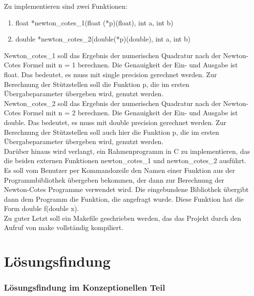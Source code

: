 \documentclass[course=erap]{aspdoc}
\begin{document}
Zu implementieren sind zwei Funktionen:
\begin{enumerate}
\item float *newton\_cotes\_1(float (*p)(float), int a, int b)
\item double *newton\_cotes\_2(double(*p)(double), int a, int b)
\end{enumerate}
Newton\_cotes\_1 soll das Ergebnis der numerischen Quadratur nach der Newton-Cotes Formel mit n = 1 berechnen. Die Genauigkeit der Ein- und Ausgabe ist float. Das bedeutet, es muss mit single precision gerechnet werden. Zur Berechnung der Stützstellen soll die Funktion p, die im ersten Übergabeparameter übergeben wird, genutzt werden.\\
Newton\_cotes\_2 soll das Ergebnis der numerischen Quadratur nach der Newton-Cotes Formel mit n = 2 berechnen. Die Genauigkeit der Ein- und Ausgabe ist double. Das bedeutet, es muss mit double precision gerechnet werden. Zur Berechnung der Stützstellen soll auch hier die Funktion p, die im ersten Übergabeparameter übergeben wird, genutzt werden.\\
Darüber hinaus wird verlangt, ein Rahmenprogramm in C zu implementieren, das die beiden externen Funktionen newton\_cotes\_1 und newton\_cotes\_2 ausführt. Es soll vom Benutzer per Kommandozeile den Namen einer Funktion aus der Programmbibliothek übergeben bekommen, der dann zur Berechnung der Newton-Cotes Programme verwendet wird. Die eingebundene Bibliothek übergibt dann dem Programm die Funktion, die angefragt wurde. Diese Funktion hat die Form \glqq double f(double x)\grqq{}.\\
Zu guter Letzt soll ein Makefile geschrieben werden, das das Projekt durch den Aufruf von \glqq make\grqq{} vollständig kompiliert.

\section{Lösungsfindung}
\subsubsection{Lösungsfindung im Konzeptionellen Teil}
\end{document}
